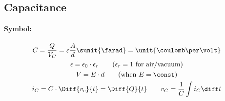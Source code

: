 
\subsection{Capacitance} %
	
	\begin{wrapfigure}[0]{r}{.5\columnwidth}
		\vspace{-1.5cm}
		\hspace{3mm}
	\end{wrapfigure}
		
	\paragraph{Symbol:} %
	
	\begin{gather*}
		C = \frac{Q}{V_C} = \varepsilon \frac{A}{d} \sunit{\farad} = \unit{\coulomb\per\volt} \\
		\epsilon = \epsilon_0 \cdot \epsilon_r \tag{$\epsilon_r = 1$ for air/vacuum} \\
		V = E \cdot d \tag{when $E = \const$} \\
		i_C = C \cdot \Diff{v_c}{t} = \Diff{Q}{t} \qquad
		v_C = \frac{1}{C} \int i_C \diff t
	\end{gather*}
	
